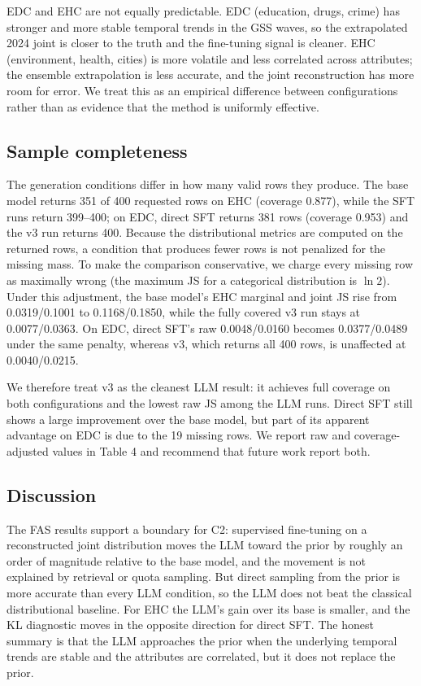 EDC and EHC are not equally predictable. EDC (education, drugs, crime)
has stronger and more stable temporal trends in the GSS waves, so the
extrapolated 2024 joint is closer to the truth and the fine-tuning
signal is cleaner. EHC (environment, health, cities) is more volatile
and less correlated across attributes; the ensemble extrapolation is
less accurate, and the joint reconstruction has more room for error. We
treat this as an empirical difference between configurations rather than
as evidence that the method is uniformly effective.

\subsection{Sample completeness}\label{sample-completeness}

The generation conditions differ in how many valid rows they produce.
The base model returns 351 of 400 requested rows on EHC (coverage
0.877), while the SFT runs return 399--400; on EDC, direct SFT returns
381 rows (coverage 0.953) and the v3 run returns 400. Because the
distributional metrics are computed on the returned rows, a condition
that produces fewer rows is not penalized for the missing mass. To make
the comparison conservative, we charge every missing row as maximally
wrong (the maximum JS for a categorical distribution is \(\ln 2\)).
Under this adjustment, the base model's EHC marginal and joint JS rise
from 0.0319/0.1001 to 0.1168/0.1850, while the fully covered v3 run
stays at 0.0077/0.0363. On EDC, direct SFT's raw 0.0048/0.0160 becomes
0.0377/0.0489 under the same penalty, whereas v3, which returns all 400
rows, is unaffected at 0.0040/0.0215.

We therefore treat v3 as the cleanest LLM result: it achieves full
coverage on both configurations and the lowest raw JS among the LLM
runs. Direct SFT still shows a large improvement over the base model,
but part of its apparent advantage on EDC is due to the 19 missing rows.
We report raw and coverage-adjusted values in Table 4 and recommend that
future work report both.

\subsection{Discussion}\label{discussion-1}

The FAS results support a boundary for C2: supervised fine-tuning on a
reconstructed joint distribution moves the LLM toward the prior by
roughly an order of magnitude relative to the base model, and the
movement is not explained by retrieval or quota sampling. But direct
sampling from the prior is more accurate than every LLM condition, so
the LLM does not beat the classical distributional baseline. For EHC the
LLM's gain over its base is smaller, and the KL diagnostic moves in the
opposite direction for direct SFT. The honest summary is that the LLM
approaches the prior when the underlying temporal trends are stable and
the attributes are correlated, but it does not replace the prior.

